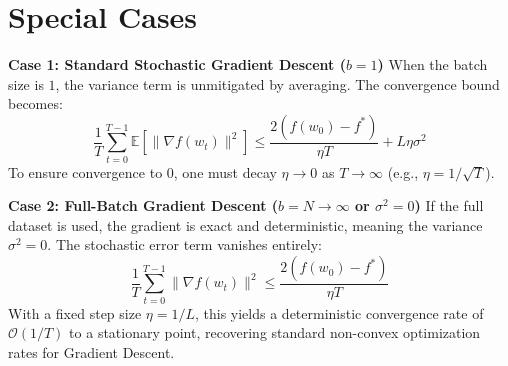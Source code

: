 \documentclass{article}
\begin{document}
\section*{Special Cases}

\textbf{Case 1: Standard Stochastic Gradient Descent ($b=1$)}
When the batch size is $1$, the variance term is unmitigated by averaging. The convergence bound becomes:
\begin{equation}
    \frac{1}{T} \sum_{t=0}^{T-1} \mathbb{E}[\|\nabla f(w_t)\|^2] \leq \frac{2(f(w_0) - f^*)}{\eta T} + L \eta \sigma^2
\end{equation}
To ensure convergence to $0$, one must decay $\eta \to 0$ as $T \to \infty$ (e.g., $\eta = 1/\sqrt{T}$).

\textbf{Case 2: Full-Batch Gradient Descent ($b = N \to \infty$ or $\sigma^2 = 0$)}
If the full dataset is used, the gradient is exact and deterministic, meaning the variance $\sigma^2 = 0$. The stochastic error term vanishes entirely:
\begin{equation}
    \frac{1}{T} \sum_{t=0}^{T-1} \|\nabla f(w_t)\|^2 \leq \frac{2(f(w_0) - f^*)}{\eta T}
\end{equation}
With a fixed step size $\eta = 1/L$, this yields a deterministic convergence rate of $\mathcal{O}(1/T)$ to a stationary point, recovering standard non-convex optimization rates for Gradient Descent.
\end{document}
